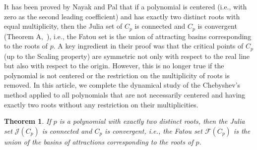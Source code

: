 \documentclass[12pt]{article}
\newtheorem{maintheorem}{Theorem}
\begin{document}
\par It has been proved by Nayak and Pal that if a polynomial is centered (i.e., with zero as the second leading coefficient) and has exactly two distinct roots with equal multiplicity, then the Julia set of $C_p$ is connected and $C_p$ is convergent (Theorem A,~\cite{Sym_dyn}), i.e., the Fatou set is the union of attracting basins corresponding to the roots of $p$. A key ingredient in their proof was that the critical points of $C_p$ (up to the Scaling property) are symmetric not only with  respect to the real line but also with respect to the origin. However, this is no longer true if the polynomial is not centered or the restriction on the multiplicity of roots is removed. In this article, we complete the dynamical study of the Chebyshev's method applied to all polynomials that are not necessarily centered  and having exactly two roots without any restriction on their multiplicities.  

\begin{maintheorem}\label{connected-convergent}
	If $p$ is a polynomial with exactly  two distinct roots,  then  the Julia set $\mathcal{J}(C_p)$   is connected and  $C_p$ is convergent, i.e., the Fatou set $\mathcal{F}(C_p)$ is the union of the basins of attractions corresponding to the roots of $p$.
	\end{maintheorem}
	
\end{document}
